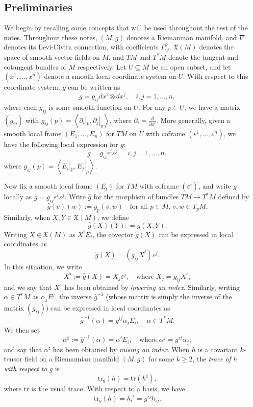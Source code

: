 \documentclass{amsart}
\numberwithin{equation}{section}
\def\frak#1{\mathfrak{#1}}
\newcommand{\ve}{\varepsilon}
\newcommand{\del}{\partial}
\newcommand{\tr}{\mathrm{tr}}
\newcommand{\law}{\left\langle}
\newcommand{\raw}{\right\rangle}
\theoremstyle{plain}
\theoremstyle{definition}
\theoremstyle{remark}
\begin{document}
\subsection{Preliminaries} We begin by recalling some concepts that will be used throughout the rest of the notes. Throughout these notes, $(M, g)$ denotes a Riemannian manifold, and $\nabla$ denotes its Levi-Civita connection, with coefficients $\Gamma^k_{ij}$. $\frak{X}(M)$ denotes the space of smooth vector fields on $M$, and $TM$ and $T^*M$ denote the tangent and cotangent bundles of $M$ respectively. Let $U\subseteq M$ be an open subset, and let $(x^1, \ldots, x^n)$ denote a smooth local coordinate system on $U$. With respect to this coordinate system, $g$ can be written as
\[g = g_{ij} dx^i \otimes dx^j, \quad i, j = 1, \ldots, n,\]
where each $g_{ij}$ is some smooth function on $U$. For any $p \in U$, we have a matrix $(g_{ij})$ with $g_{ij}(p) =\law \del_i|_p, \del_j|_p \raw$, where $\del_i = \frac{\del}{\del x^i}$. More generally, given a smooth local frame $(E_1, \ldots, E_n)$ for $TM$ on $U$ with coframe $(\ve^1, \hdots, \ve^n)$, we have the following local expression for $g$:
\[g = g_{ij}\ve^i \ve^j,  \quad i, j = 1, \ldots, n,\]
where $g_{ij}(p) = \law E_i|_p, E_j|_p \raw$.

Now fix a smooth local frame $(E_i)$ for $TM$ with coframe $(\ve^i)$, and write $g$ locally as $g = g_{ij}\ve^i \ve^j$. Write $\hat{g}$ for the morphism of bundles $TM \to T^*M$ defined by 
\[\hat{g}(v)(w) := g_p(v,w) \quad \text{for all } p \in M, \, v,w \in T_p M.\]
Similarly, when $X, Y \in \frak{X}(M)$, we define
\[\hat{g}(X)(Y) : = g(X,Y).\]
Writing $X \in \frak{X}(M)$ as $X^iE_i$, the covector $\hat{g}(X)$ can be expressed in local coordinates as 
\[\hat{g}(X) = \left(g_{ij}X^i\right)\ve^j.\]
In this situation, we write
\begin{equation}\label{eq:flat}
X^\flat := \hat{g}(X) = X_j \ve^j, \quad \text{where } X_j = g_{ij}X^i,\end{equation}
and we say that $X^\flat$ has been obtained by \emph{lowering an index}. Similarly, writing $\alpha \in T^*M$ as $\alpha_jE^j$, the inverse $\hat{g}^{-1}$ (whose matrix is simply the inverse of the matrix $(g_{ij})$) can be expressed in local coordinates as
\[\hat{g}^{-1}(\alpha) = g^{ij}\alpha_{j} E_i, \quad \alpha \in T^*M.\]
We then set
\begin{equation}\label{eq:sharp}
    \alpha^\sharp := \hat{g}^{-1}(\alpha) = \alpha^i E_i, \quad \text{where } \alpha^j = g^{ij}\alpha_{j}, 
\end{equation}
and say that $\alpha^\sharp$ has been obtained by \emph{raising an index}. When $h$ is a covariant $k$-tensor field on a Riemannian manifold $(M,g)$ for some $k \ge 2$, the \emph{trace of $h$ with respect to $g$} is 
\begin{equation}\label{eq:tr_g}\tr_g(h) = \tr(h^\sharp),\end{equation}
where $\tr$ is the usual trace. With respect to a basis, we have
\begin{equation}\label{eq:tr_g.2}\tr_g(h) = {h_i}^i = g^{ij}h_{ij}.\end{equation}
\end{document}
